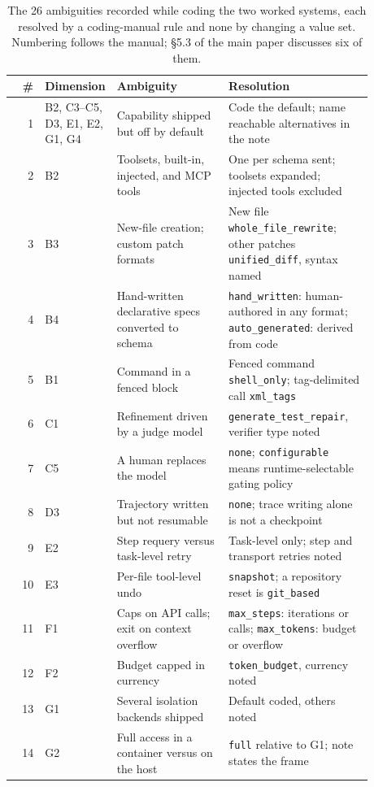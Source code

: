 \begin{table}[htbp]
\caption{The 26 ambiguities recorded while coding the two worked systems, each resolved by a
coding-manual rule and none by changing a value set. Numbering follows the manual; \S5.3 of the main
paper discusses six of them.}
\label{tab:ambiguities-full}
\footnotesize
\begin{tabular}{@{}r p{0.17\linewidth} p{0.31\linewidth} p{0.40\linewidth}@{}}
\toprule
\# & Dimension & Ambiguity & Resolution \tabularnewline
\midrule
1 & B2, C3--C5, D3, E1, E2, G1, G4 & \raggedright Capability shipped but off by default & \raggedright Code the default; name reachable alternatives in the note \tabularnewline
2 & B2 & \raggedright Toolsets, built-in, injected, and MCP tools & \raggedright One per schema sent; toolsets expanded; injected tools excluded \tabularnewline
3 & B3 & \raggedright New-file creation; custom patch formats & \raggedright New file \texttt{whole\_file\_rewrite}; other patches \texttt{unified\_diff}, syntax named \tabularnewline
4 & B4 & \raggedright Hand-written declarative specs converted to schema & \raggedright \texttt{hand\_written}: human-authored in any format; \texttt{auto\_generated}: derived from code \tabularnewline
5 & B1 & \raggedright Command in a fenced block & \raggedright Fenced command \texttt{shell\_only}; tag-delimited call \texttt{xml\_tags} \tabularnewline
6 & C1 & \raggedright Refinement driven by a judge model & \raggedright \texttt{generate\_test\_repair}, verifier type noted \tabularnewline
7 & C5 & \raggedright A human replaces the model & \raggedright \texttt{none}; \texttt{configurable} means runtime-selectable gating policy \tabularnewline
8 & D3 & \raggedright Trajectory written but not resumable & \raggedright \texttt{none}; trace writing alone is not a checkpoint \tabularnewline
9 & E2 & \raggedright Step requery versus task-level retry & \raggedright Task-level only; step and transport retries noted \tabularnewline
10 & E3 & \raggedright Per-file tool-level undo & \raggedright \texttt{snapshot}; a repository reset is \texttt{git\_based} \tabularnewline
11 & F1 & \raggedright Caps on API calls; exit on context overflow & \raggedright \texttt{max\_steps}: iterations or calls; \texttt{max\_tokens}: budget or overflow \tabularnewline
12 & F2 & \raggedright Budget capped in currency & \raggedright \texttt{token\_budget}, currency noted \tabularnewline
13 & G1 & \raggedright Several isolation backends shipped & \raggedright Default coded, others noted \tabularnewline
14 & G2 & \raggedright Full access in a container versus on the host & \raggedright \texttt{full} relative to G1; note states the frame \tabularnewline

\end{tabular}
\end{table}
